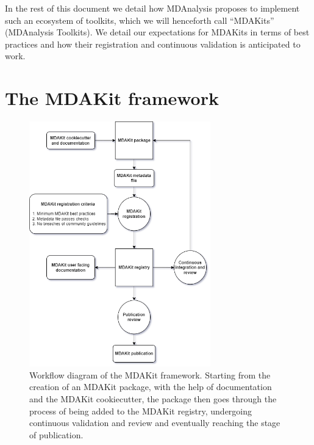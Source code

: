 \documentclass{article}
\begin{document}
In the rest of this document we detail how MDAnalysis proposes to implement such an ecosystem of toolkits, which we will henceforth call “MDAKits” (MDAnalysis Toolkits). We detail our expectations for MDAKits in terms of best practices and how their registration and continuous validation is anticipated to work.

\section{The MDAKit framework}

\begin{figure}
    \centering
    \includegraphics[width=0.7\textwidth]{figures/MDAKitFramework.png}
    \caption{Workflow diagram of the MDAKit framework. Starting from the creation of an MDAKit package, with the help of documentation and the MDAKit cookiecutter, the package then goes through the process of being added to the MDAKit registry, undergoing continuous validation and review and eventually reaching the stage of publication.}
    \label{fig:workflow}
\end{figure}
\end{document}
